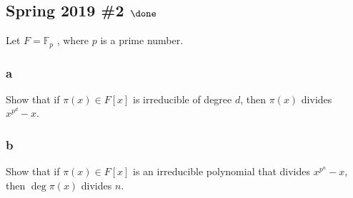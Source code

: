 \hypertarget{spring-2019-2-done}{%
\subsection{\texorpdfstring{Spring 2019 \#2
\(\done\)}{Spring 2019 \#2 \textbackslash done}}\label{spring-2019-2-done}}

Let \(F = {\mathbb{F}}_p\) , where \(p\) is a prime number.

\hypertarget{a-53}{%
\subsubsection{a}\label{a-53}}

Show that if \(\pi(x) \in F[x]\) is irreducible of degree \(d\), then
\(\pi(x)\) divides \(x^{p^d} - x\).

\hypertarget{b-43}{%
\subsubsection{b}\label{b-43}}

Show that if \(\pi(x) \in F[x]\) is an irreducible polynomial that
divides \(x^{p^n} - x\), then \(\deg \pi(x)\) divides \(n\).

